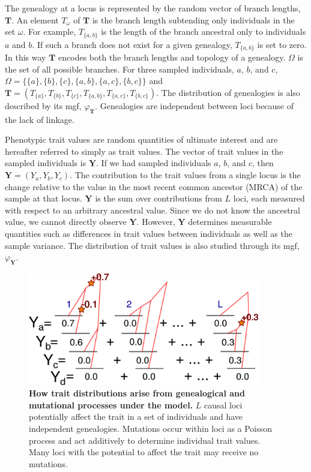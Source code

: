 The genealogy at a locus is represented by the random vector of branch lengths,
$\mathbf{T}$. An element $T_{\omega}$ of $\mathbf{T}$ is the branch length
subtending only individuals in the set $\omega$. For example, $T_{\{a,b\}}$ is
the length of the branch ancestral only to individuals $a$ and $b$. If such a
branch does not exist for a given genealogy, $T_{\{a,b\}}$ is set to zero. In
this way $\mathbf{T}$ encodes both the branch lengths and topology of a
genealogy. $\Omega$ is the set of all possible branches. For three sampled
individuals, $a$, $b$, and $c$,
$\Omega=\{\{a\},\{b\},\{c\},\{a,b\},\{a,c\},\{b,c\}\}$ and
$\mathbf{T}=(T_{\{a\}},T_{\{b\}},T_{\{c\}},T_{\{a,b\}},T_{\{a,c\}},T_{\{b,c\}})$.
The distribution of genealogies is also described by its mgf,
$\varphi_{\mathbf{T}}$. Genealogies are independent between loci because of the
lack of linkage.

Phenotypic trait values are random quantities of ultimate interest and are
hereafter referred to simply as trait values. The vector of trait values in the
sampled individuals is $\mathbf{Y}$. If we had sampled individuals $a$, $b$, and
$c$, then $\mathbf{Y}=(Y_a,Y_b,Y_c)$. The contribution to the trait values from
a single locus is the change relative to the value in the most recent common
ancestor (MRCA) of the sample at that locus. $\mathbf{Y}$ is the sum over
contributions from $L$ loci, each measured with respect to an arbitrary
ancestral value. Since we do not know the ancestral value, we cannot directly
observe $\mathbf{Y}$. However, $\mathbf{Y}$ determines measurable quantities
such as differences in trait values between individuals as well as the sample
variance. The distribution of trait values is also studied through its mgf,
$\varphi_{\mathbf{Y}}$.

\begin{figure}
  \centering
  \includegraphics[width=0.9\textwidth]{./figures/schema.png}

  \caption{\textbf{How trait distributions arise from genealogical and
      mutational processes under the model.} $L$ causal loci potentially affect
    the trait in a set of individuals and have independent genealogies.
    Mutations occur within loci as a Poisson process and act additively to
    determine individual trait values. Many loci with the potential to affect
    the trait may receive no mutations.}

  \label{fig:schema}
\end{figure}

